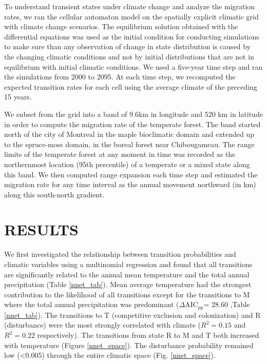 To understand transient states under climate change and analyze the migration rates, we ran the
cellular automaton model on the spatially explicit climatic grid with climate change scenarios. The
equilibrium solution obtained with the differential equations was used as the initial condition for
conducting simulations to make sure than any observation of change in state distribution is caused
by the changing climatic conditions and not by initial distributions that are not in equilibrium
with initial climatic conditions. We used a five-year time step and ran the  simulations from 2000
to 2095. At each time step, we recomputed the expected transition rates for each cell using the
average climate of the preceding 15 years.

We subset from the grid into a band of 9.6km in longitude and 520 km in latitude in order to compute
the migration rate of the temperate forest. The band started north of the city of Montreal in the
maple bioclimatic domain and extended up to the spruce-moss domain, in the boreal forest near
Chibougameau. The range limits of the temperate forest at any moment in time was recorded as the
northernmost location (95th percentile) of a temperate or a mixed state along this band. We then
computed range expansion each time step and estimated the migration rate for any time interval as
the annual movement northward (in km) along this south-north gradient.

\cleardoublepage

\section*{\uppercase{Results}}


We first investigated the relationship between transition probabilities and climatic variables using
a multinomial regression and found that all transitions are significantly related to the annual mean
temperature and the total annual precipitation (Table \ref{nnet_tab}). Mean average temperature had
the strongest contribution to the likelihood of all transitions except for the transitions to M
where the total annual precipitation was predominant ($\Delta\text{AIC}_{pp}$= 28.60 ,Table
\ref{nnet_tab}). The transitions to T (competitive exclusion and colonization) and R (disturbance)
were the most strongly correlated with climate ($R^2 = 0.15$ and $R^2 = 0.22$ respectively). The
transitions from state R to M and T both increased with temperature (Figure \ref{nnet_space}). The
disturbance probability remained low (<0.005) through the entire climatic space (Fig.
\ref{nnet_space}).

